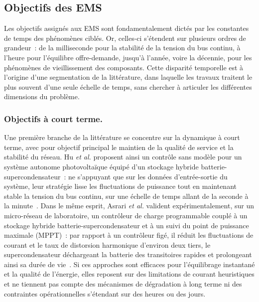 \subsection{Objectifs des EMS}

Les objectifs assignés aux EMS sont fondamentalement dictés par les constantes de temps des phénomènes ciblés.
Or, celles-ci s'étendent sur plusieurs ordres de grandeur~: de la milliseconde pour la stabilité de la tension du bus continu, à l'heure pour l'équilibre offre-demande, jusqu'à l'année, voire la décennie, pour les phénomènes de vieillissement des composants.
Cette disparité temporelle est à l'origine d'une segmentation de la littérature, dans laquelle les travaux traitent le plus souvent d'une seule échelle de temps, sans chercher à articuler les différentes dimensions du problème.

\subsubsection{Objectifs à court terme.}
Une première branche de la littérature se concentre sur la dynamique à court terme, avec pour objectif principal le maintien de la qualité de service et la stabilité du réseau.
Hu \textit{et al.} proposent ainsi un contrôle sans modèle pour un système autonome photovoltaïque équipé d'un stockage hybride batterie-supercondensateur~: ne s'appuyant que sur les données d'entrée-sortie du système, leur stratégie lisse les fluctuations de puissance tout en maintenant stable la tension du bus continu, sur une échelle de temps allant de la seconde à la minute~\cite{hu_data_based_2024}.
Dans le même esprit, Asrari \textit{et al.} valident expérimentalement, sur un micro-réseau de laboratoire, un contrôleur de charge programmable couplé à un stockage hybride batterie-supercondensateur et à un suivi du point de puissance maximale (MPPT)~: par rapport à un contrôleur figé, il réduit les fluctuations de courant et le taux de distorsion harmonique d'environ deux tiers, le supercondensateur déchargeant la batterie des transitoires rapides et prolongeant ainsi sa durée de vie~\cite{asrari_experimental_2025}.
Si ces approches sont efficaces pour l'équilibrage instantané et la qualité de l'énergie, elles reposent sur des limitations de courant heuristiques et ne tiennent pas compte des mécanismes de dégradation à long terme ni des contraintes opérationnelles s'étendant sur des heures ou des jours.

